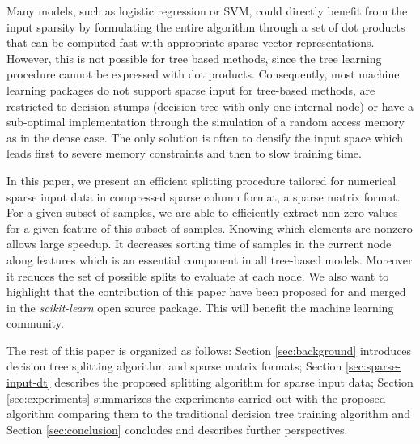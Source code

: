 Many models, such as logistic regression or SVM, could directly
benefit from the input sparsity by formulating the entire algorithm
through a set of dot products that can be computed fast with
appropriate sparse vector representations. However, this is not
possible for tree based methods, since the tree learning procedure
cannot be expressed with dot products. Consequently, most machine
learning packages do not support sparse input for tree-based methods,
are restricted to decision stumps (decision tree with only one
internal node) or have a sub-optimal implementation through the
simulation of a random access memory as in the dense case. The only
solution is often to densify the input space which leads first to
severe memory constraints and then to slow training time.

In this paper, we present an efficient splitting procedure tailored for
numerical sparse input data in compressed sparse column format, a sparse matrix
format. For a given subset of samples, we are able to efficiently extract non
zero values for a given feature of this subset of samples. Knowing which
elements are nonzero allows large speedup. It decreases sorting time of
samples in the current node along features which is an essential component in
all tree-based models. Moreover it reduces the set of possible splits to
evaluate at each node. We also want to highlight that the contribution of this
paper have been proposed for and merged in the \emph{scikit-learn}
\cite{buitinck2013api,pedregosa2011scikit} open source package. This will
benefit the machine learning community.

The rest of this paper is organized as follows: Section \ref{sec:background}
introduces decision tree splitting algorithm and sparse matrix formats; Section
\ref{sec:sparse-input-dt} describes the proposed splitting algorithm for sparse
input data; Section \ref{sec:experiments} summarizes the experiments carried out with the proposed algorithm comparing them to the traditional decision tree training algorithm
and Section \ref{sec:conclusion} concludes and describes further
perspectives.

